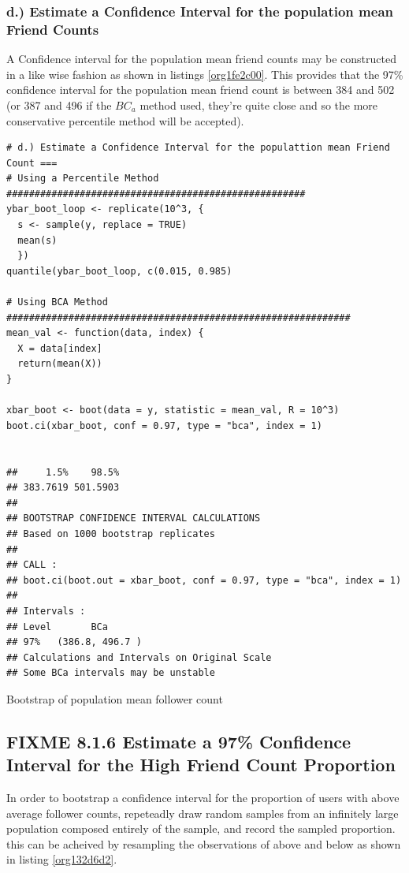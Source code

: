 \documentclass[11pt]{article}
\begin{document}
\subsubsection{d.) Estimate a Confidence Interval for the population mean Friend Counts}
\label{sec:orgaac85ac}
A Confidence interval for the population mean friend counts may be constructed in a like wise fashion as shown in listings \ref{org1fe2c00}. This provides that the 97\% confidence interval for the population mean friend count is between 384 and 502 (or 387 and 496 if the \(BC_{a}\) method used, they're quite close and so the more conservative percentile method will be accepted).

\begin{listing}[htbp]
\begin{verbatim}
# d.) Estimate a Confidence Interval for the populattion mean Friend Count ===
# Using a Percentile Method #####################################################
ybar_boot_loop <- replicate(10^3, {
  s <- sample(y, replace = TRUE)
  mean(s)
  })
quantile(ybar_boot_loop, c(0.015, 0.985)

# Using BCA Method #############################################################
mean_val <- function(data, index) {
  X = data[index]
  return(mean(X))
}

xbar_boot <- boot(data = y, statistic = mean_val, R = 10^3)
boot.ci(xbar_boot, conf = 0.97, type = "bca", index = 1)


##     1.5%    98.5%
## 383.7619 501.5903
##
## BOOTSTRAP CONFIDENCE INTERVAL CALCULATIONS
## Based on 1000 bootstrap replicates
##
## CALL :
## boot.ci(boot.out = xbar_boot, conf = 0.97, type = "bca", index = 1)
##
## Intervals :
## Level       BCa
## 97%   (386.8, 496.7 )
## Calculations and Intervals on Original Scale
## Some BCa intervals may be unstable
\end{verbatim}
\caption{\label{org1fe2c00}Bootstrap of population mean follower count}
\end{listing}

\subsection{{\bfseries\sffamily FIXME} 8.1.6 Estimate a 97\% Confidence Interval for the High Friend Count Proportion}
\label{sec:org28e2098}
In order to bootstrap a confidence interval for the proportion of users with
above average follower counts, repeteadly draw random samples from an infinitely
large population composed entirely of the sample, and record the sampled
proportion. this can be acheived by resampling the observations of above and
below as shown in listing \ref{org132d6d2}.
\end{document}
